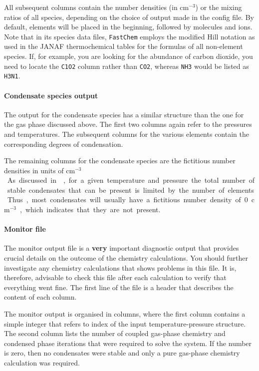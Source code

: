 \documentclass[numbers=noenddot]{aux/fcmanual}
\newcommand{\fc}{\texttt{FastChem}\xspace}
\begin{document}
All subsequent columns contain the number densities (in cm$^{-3}$) or the mixing ratios of all species, depending on the choice of output made in the config file. By default, elements will be placed in the beginning, followed by molecules and ions. Note that in its species data files, \fc employs the modified Hill notation as used in the JANAF thermochemical tables \citep{Chase1986jtt..book.....C} for the formulas of all non-element species. If, for example, you are looking for the abundance of carbon dioxide, you need to locate the \verb|C1O2| column rather than \verb|CO2|, whereas \verb|NH3| would be listed as \verb|H3N1|.


\paragraph{Condensate species output} 
The output for the condensate species has a similar structure than the one for the gas phase discussed above. The first two columns again refer to the pressures and temperatures. The subsequent columns for the various elements contain the corresponding degrees of condensation. 

The remaining columns for the condensate species are the fictitious number densities in units of \unit{cm$^{-3}$}. As discussed in \citet{Kitzmann2023inprep}, for a given temperature and pressure the total number of stable condensates that can be present is limited by the number of elements. Thus, most condensates will usually have a fictitious number density of 0 \unit{cm$^{-3}$}, which indicates that they are not present.


\paragraph{Monitor file} The monitor output file is a \textbf{very} important diagnostic output that provides crucial details on the outcome of the chemistry calculations. You should further investigate any chemistry calculations that shows problems in this file. It is, therefore, advisable to check this file after each calculation to verify that everything went fine. The first line of the file is a header that describes the content of each column.

The monitor output is organised in columns, where the first column contains a simple integer that refers to index of the input temperature-pressure structure. The second column lists the number of coupled gas-phase chemistry and condensed phase iterations that were required to solve the system. If the number is zero, then no condensates were stable and only a pure gas-phase chemistry calculation was required.
\end{document}
